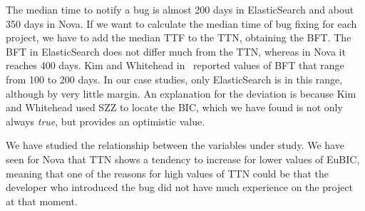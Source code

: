 \documentclass[10pt, conference]{IEEEtran}
\begin{document}
The median time to notify a bug is almost 200 days in ElasticSearch and about 350 days in Nova. If we want to calculate the median time of bug fixing for each project, we have to add the median TTF to the TTN, obtaining the BFT. The BFT in ElasticSearch does not differ much from the TTN, whereas in Nova it reaches 400 days.
Kim and Whitehead in~\cite{kim2006long} reported values of BFT that range from 100 to 200 days. In our case studies, only ElasticSearch is in this range, although by very little margin. An explanation for the deviation is because Kim and Whitehead used SZZ to locate the BIC, which we have found is not only always \emph{true}, but provides an optimistic value.

\vspace{0.2cm}
\vspace{0.1cm}

We have studied the relationship between the variables under study. We have seen for Nova that TTN shows a tendency to increase for lower values of EuBIC, meaning that one of the reasons for high values of TTN could be that the developer who introduced the bug did not have much experience on the project at that moment.

\vspace{0.2cm}
\vspace{0.1cm}
\end{document}

